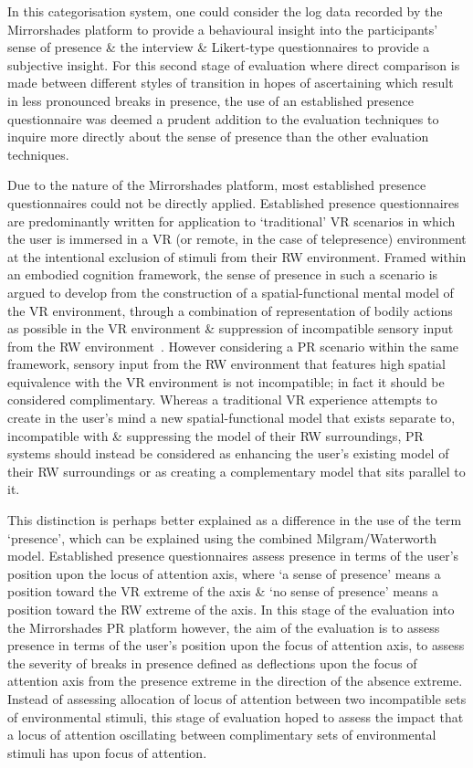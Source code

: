 In this categorisation system, one could consider the log data recorded by the Mirrorshades platform to provide a behavioural insight into the participants' sense of presence \& the interview \& Likert-type questionnaires to provide a subjective insight. For this second stage of evaluation where direct comparison is made between different styles of transition in hopes of ascertaining which result in less pronounced breaks in presence, the use of an established presence questionnaire was deemed a prudent addition to the evaluation techniques to inquire more directly about the sense of presence than the other evaluation techniques.


Due to the nature of the Mirrorshades platform, most established presence questionnaires could not be directly applied. Established presence questionnaires are predominantly written for application to `traditional' VR scenarios in which the user is immersed in a VR (or remote, in the case of telepresence) environment at the intentional exclusion of stimuli from their RW environment. Framed within an embodied cognition framework, the sense of presence in such a scenario is argued to develop from the construction of a spatial-functional mental model of the VR environment, through a combination of representation of bodily actions as possible in the VR environment \& suppression of incompatible sensory input from the RW environment~\cite{Schubert2001}. However considering a PR scenario within the same framework, sensory input from the RW environment that features high spatial equivalence with the VR environment is not incompatible; in fact it should be considered complimentary. Whereas a traditional VR experience attempts to create in the user's mind a new spatial-functional model that exists separate to, incompatible with \& suppressing the model of their RW surroundings, PR systems should instead be considered as enhancing the user's existing model of their RW surroundings or as creating a complementary model that sits parallel to it.

This distinction is perhaps better explained as a difference in the use of the term `presence', which can be explained using the combined Milgram/Waterworth model. Established presence questionnaires assess presence in terms of the user's position upon the locus of attention axis, where `a sense of presence' means a position toward the VR extreme of the axis \& `no sense of presence' means a position toward the RW extreme of the axis. In this stage of the evaluation into the Mirrorshades PR platform however, the aim of the evaluation is to assess presence in terms of the user's position upon the focus of attention axis, to assess the severity of breaks in presence defined as deflections upon the focus of attention axis from the presence extreme in the direction of the absence extreme. Instead of assessing allocation of locus of attention between two incompatible sets of environmental stimuli, this stage of evaluation hoped to assess the impact that a locus of attention oscillating between complimentary sets of environmental stimuli has upon focus of attention.

